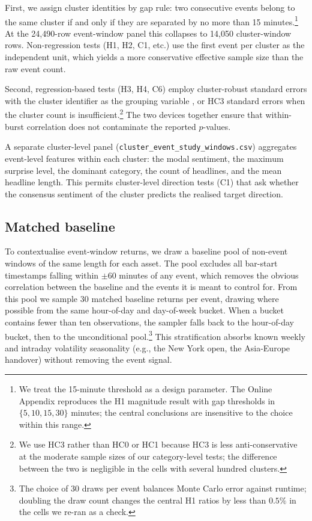 First, we assign cluster identities by gap rule: two consecutive
events belong to the same cluster if and only if they are separated
by no more than 15 minutes.\footnote{We treat the 15-minute
threshold as a design parameter. The Online Appendix reproduces the
H1 magnitude result with gap thresholds in $\{5, 10, 15, 30\}$
minutes; the central conclusions are insensitive to the choice
within this range.} At the 24{,}490-row event-window panel this
collapses to 14{,}050 cluster-window rows. Non-regression tests
(H1, H2, C1, etc.) use the first event per cluster as the
independent unit, which yields a more conservative effective sample
size than the raw event count.

Second, regression-based tests (H3, H4, C6) employ cluster-robust
standard errors with the cluster identifier as the grouping variable
\citep{white1980heteroskedasticity}, or HC3 standard errors when the
cluster count is insufficient.\footnote{We use HC3 rather than HC0
or HC1 because HC3 is less anti-conservative at the moderate sample
sizes of our category-level tests; the difference between the two
is negligible in the cells with several hundred clusters.} The two
devices together ensure that within-burst correlation does not
contaminate the reported $p$-values.

A separate cluster-level panel
(\texttt{cluster\_event\_study\_windows.csv}) aggregates event-level
features within each cluster: the modal sentiment, the maximum
surprise level, the dominant category, the count of headlines, and
the mean headline length. This permits cluster-level direction
tests (C1) that ask whether the consensus sentiment of the cluster
predicts the realised target direction.

\subsection{Matched baseline}
\label{ssec:matched-baseline}

To contextualise event-window returns, we draw a baseline pool of
non-event windows of the same length for each asset. The pool
excludes all bar-start timestamps falling within $\pm 60$ minutes of
any event, which removes the obvious correlation between the
baseline and the events it is meant to control for. From this pool
we sample 30 matched baseline returns per event, drawing where
possible from the same hour-of-day and day-of-week bucket. When a
bucket contains fewer than ten observations, the sampler falls back
to the hour-of-day bucket, then to the unconditional pool.\footnote{The
choice of 30 draws per event balances Monte Carlo error against
runtime; doubling the draw count changes the central H1 ratios by
less than $0.5\%$ in the cells we re-ran as a check.} This
stratification absorbs known weekly and intraday volatility
seasonality (e.g., the New York open, the Asia-Europe handover)
without removing the event signal.

